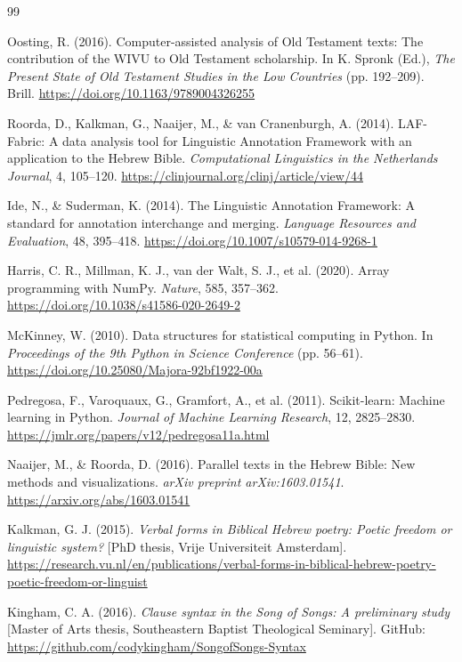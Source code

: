 \documentclass[11pt,a4paper]{article}
\begin{document}
\begin{thebibliography}{99}

Oosting, R. (2016). Computer-assisted analysis of Old Testament texts: The contribution of the WIVU to Old Testament scholarship. In K. Spronk (Ed.), \textit{The Present State of Old Testament Studies in the Low Countries} (pp. 192--209). Brill. \url{https://doi.org/10.1163/9789004326255}

Roorda, D., Kalkman, G., Naaijer, M., \& van Cranenburgh, A. (2014). LAF-Fabric: A data analysis tool for Linguistic Annotation Framework with an application to the Hebrew Bible. \textit{Computational Linguistics in the Netherlands Journal}, 4, 105--120. \url{https://clinjournal.org/clinj/article/view/44}

Ide, N., \& Suderman, K. (2014). The Linguistic Annotation Framework: A standard for annotation interchange and merging. \textit{Language Resources and Evaluation}, 48, 395--418. \url{https://doi.org/10.1007/s10579-014-9268-1}

Harris, C. R., Millman, K. J., van der Walt, S. J., et al. (2020). Array programming with NumPy. \textit{Nature}, 585, 357--362. \url{https://doi.org/10.1038/s41586-020-2649-2}

McKinney, W. (2010). Data structures for statistical computing in Python. In \textit{Proceedings of the 9th Python in Science Conference} (pp. 56--61). \url{https://doi.org/10.25080/Majora-92bf1922-00a}

Pedregosa, F., Varoquaux, G., Gramfort, A., et al. (2011). Scikit-learn: Machine learning in Python. \textit{Journal of Machine Learning Research}, 12, 2825--2830. \url{https://jmlr.org/papers/v12/pedregosa11a.html}

Naaijer, M., \& Roorda, D. (2016). Parallel texts in the Hebrew Bible: New methods and visualizations. \textit{arXiv preprint arXiv:1603.01541}. \url{https://arxiv.org/abs/1603.01541}

Kalkman, G. J. (2015). \textit{Verbal forms in Biblical Hebrew poetry: Poetic freedom or linguistic system?} [PhD thesis, Vrije Universiteit Amsterdam]. \url{https://research.vu.nl/en/publications/verbal-forms-in-biblical-hebrew-poetry-poetic-freedom-or-linguist}

Kingham, C. A. (2016). \textit{Clause syntax in the Song of Songs: A preliminary study} [Master of Arts thesis, Southeastern Baptist Theological Seminary]. GitHub: \url{https://github.com/codykingham/SongofSongs-Syntax}


\end{thebibliography}
\end{document}
